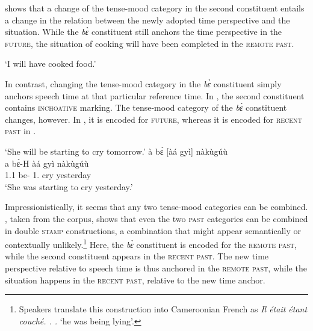  shows that a change of the tense-mood category in the second constituent entails a change in the relation between the newly adopted time perspective and the situation. While the {\itshape bɛ̀} constituent still anchors the time perspective in the \textsc{future}, the situation of cooking will have been completed in the \textsc{remote past}.

 
    \trans `I will have cooked food.'
\z

In contrast, changing the tense-mood category in the {\itshape bɛ̀} constituent simply anchors speech time at that particular reference time. In , the second constituent contains \textsc{inchoative} marking. The tense-mood category of the {\itshape bɛ̀} constituent changes, however. In , it is encoded for \textsc{future}, whereas it is encoded for  \textsc{recent} \textsc{past} in .

\ea\label{embed3}
\jambox*{({\FUT} - {\INCH})}
    \trans `She will be starting to cry tomorrow.'
\ex\label{embed3b}
  {\glll  à bɛ́ [àá gyì]\textsubscript{{\INCH}} nàkùgúù \\
          a bɛ̀-H {\db}àá gyì nàkùgúù \\
           1.{\PST}1 be-{\PST} {\db}1.{\INCH} cry yesterday\\}
    \trans `She was starting to cry yesterday.'
\z
\z

 Impressionistically, it seems that any two tense-mood categories can be combined. 
, taken from the corpus, shows that even the two \textsc{past} categories can be combined in double \textsc{stamp} constructions, a combination that might appear semantically or contextually unlikely.\footnote{Speakers translate this construction into Cameroonian French as {\itshape Il était étant couché. . .} `he was being lying'.}
Here, the {\itshape bɛ̀} constituent is encoded for the \textsc{remote past}, while the second constituent appears in the  \textsc{recent past}. The new time perspective relative to speech time is thus anchored in the  \textsc{remote past}, while the situation happens in the  \textsc{recent past}, relative to the new time anchor.

